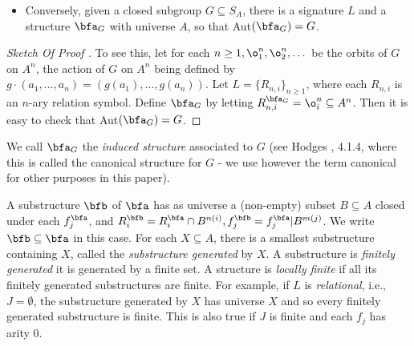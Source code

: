 \begin{theorem}
\begin{itemize}


        \item Conversely, given a closed subgroup $G \subseteq S_A$, there is a signature $L$ and a structure $\bfa_G$ with universe $A$, so that Aut$(\bfa_G )=G$.

    \end{itemize}




\end{theorem}

\begin{proof}[Sketch Of Proof ]
    To see this, let for each $n\geq 1,\o_1^n,\o_2^n,\dots$ be the orbits of $G$ on $A^n$, the action of $G$ on $A^n$ being defined by $g\cdot (a_1,\dots ,a_n)=(g(a_1),\dots , g(a_n))$.  Let $L=\{R_{n,i}\}_{n\geq 1}$, where each $R_{n,i}$ is an $n$-ary relation symbol.  Define $\bfa_G$ by letting $R^{\bfa_G}_{n,i}=\o_i^n\subseteq A^n$.  Then it is easy to check that Aut$(\bfa_G)=G$.
\end{proof}

We call $\bfa_G$
the {\it induced structure} associated to $G$ (see Hodges \cite{H}, 4.1.4,
where this is called the canonical structure for $G$ - we use however the
term canonical for other purposes in this paper).


\bigskip
A substructure $\bfb$ of $\bfa$ has as universe a (non-empty) subset
$B\subseteq A$ closed under each $f^\bfa_j$, and $R^\bfb_i=R^\bfa_i
    \cap B^{n(i)},f^\bfb_j=f^\bfa_j|B^{m(j)}$. We write $\bfb\subseteq\bfa$ in this case. For each $X\subseteq A$, there
is a smallest substructure containing $X$, called the {\it substructure
        generated} by $X$.  A substructure is {\it finitely generated} it is
generated by a finite set.  A structure is {\it locally finite} if all its
finitely generated substructures are finite.  For example, if $L$ is
    {\it relational}, i.e., $J=\emptyset$, the substructure generated by $X$
has universe $X$ and so every finitely generated substructure is finite.
This is also true if $J$ is finite and each $f_j$ has arity 0.

